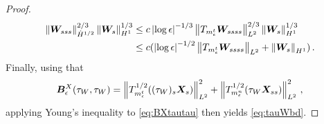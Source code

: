 \documentclass[10pt,a4paper]{amsart}
\newcommand{\X}{\bm{X}}
\newcommand{\abs}[1]{\left\lvert #1 \right\rvert}
\newcommand{\norm}[1]{\left\lVert #1 \right\rVert}
\begin{document}
\begin{proof}
\begin{equation}
\begin{aligned}
  \norm{\bm{W}_{sss}}_{\dot H^{1/2}}^{2/3}\norm{\bm{W}_s}_{H^1}^{1/3}&\le c\abs{\log\epsilon}^{-1/3}\norm{T_{m_\epsilon^{\rm t}}\bm{W}_{ssss}}_{L^2}^{2/3}\norm{\bm{W}_s}_{H^1}^{1/3}\\
  &\le c(\abs{\log\epsilon}^{-1/2}\norm{T_{m_\epsilon^{\rm t}}\bm{W}_{ssss}}_{L^2} + \norm{\bm{W}_s}_{H^1})\,.
\end{aligned}
\end{equation} 
%
%
Finally, using that 
\begin{equation}
  \bm{B}_\epsilon^X(\tau_W,\tau_W) = \norm{T_{m_\epsilon^{\rm t}}^{1/2}((\tau_W)_s\X_s)}_{L^2}^2 + 
  \norm{T_{m_\epsilon^{\rm n}}^{1/2}(\tau_W\X_{ss})}_{L^2}^2\,,
\end{equation}
applying Young's inequality to \eqref{eq:BXtautau} then yields \eqref{eq:tauWbd}.
%
%
\end{proof}
\end{document}
